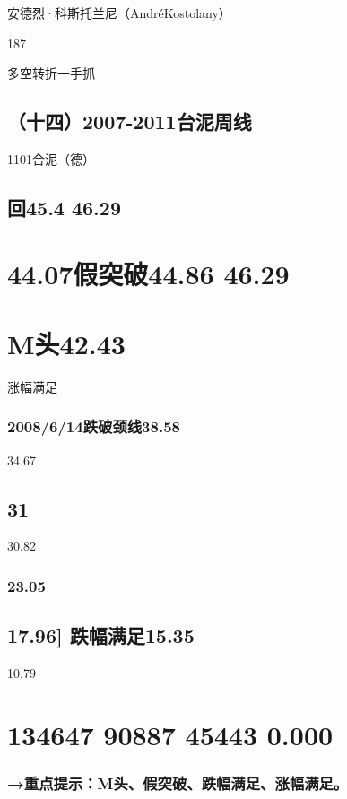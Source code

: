 \documentclass{article}
\begin{document}
安德烈·科斯托兰尼（AndréKostolany）

187

\clearpage

多空转折一手抓

\subsection{（十四）2007-2011台泥周线}

1101合泥（德）

\subsection{回45.4 46.29}

\section{44.07假突破44.86 46.29}

\section{M头42.43}

涨幅满足

\subsubsection{2008/6/14跌破颈线38.58}

34.67

\subsection{31}

30.82

\subsubsection{23.05}

\subsection{17.96] 跌幅满足15.35}

10.79

\section{134647 90887 45443 0.000}

\subsubsection{→重点提示：M头、假突破、跌幅满足、涨幅满足。}
\end{document}
